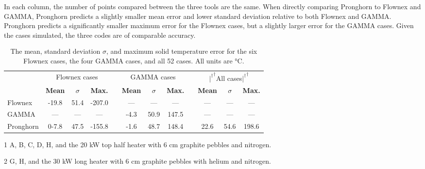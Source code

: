 In each column, the number of points compared between the three tools are the same. When directly comparing Pronghorn to Flownex and GAMMA, Pronghorn predicts a slightly smaller mean error and lower standard deviation relative to both Flownex and GAMMA. Pronghorn predicts a significantly smaller maximum error for the Flownex cases, but a slightly larger error for the GAMMA cases. Given the cases simulated, the three codes are of comparable accuracy. 

\begin{table}[h!]
\centering
\begin{threeparttable}
\caption{The mean, standard deviation \(\sigma\), and maximum solid temperature error for the six Flownex cases, the four GAMMA cases, and all 52 cases. All units are \si{\celsius}.}
\begin{tabular}{@{}lcc c c c cc c c c c@{}}
\toprule
 & \multicolumn{3}{c}{Flownex cases\hspace{0.01cm}\tnote{1}} &\phantom{a}& \multicolumn{3}{c}{GAMMA cases\hspace{0.01cm}\tnote{2}} &\phantom{a}& \multicolumn{3}{c}{\color{white}${\rvert^\dagger}^\dagger$\color{black}All cases\color{white}${\rvert^\dagger}^\dagger$\color{black}}\\
\cmidrule{2-4} \cmidrule{6-8} \cmidrule{10-12}
 & \textbf{Mean} & {\boldmath\(\sigma\)} & \textbf{Max.} && \textbf{Mean} & {\boldmath\(\sigma\)} & \textbf{Max.} && \textbf{Mean} & {\boldmath\(\sigma\)} & \textbf{Max.}\\
\midrule
Flownex & \color{white}-\color{black}19.8 & 51.4 & \color{white}-\color{black}207.0 && --- & --- & --- && --- & --- & ---\\
GAMMA & --- & --- & --- && \color{white}-\color{black}4.3 & 50.9 & 147.5 && --- & --- & ---\\
Pronghorn & \color{white}0\color{black}-7.8 & 47.5 & -155.8 && -1.6 & 48.7 & 148.4 && 22.6 & 54.6 & 198.6\\
\bottomrule
\end{tabular}
\label{table:stats}
\begin{tablenotes}
\item[1] \small A, B, C, D, H, and the 20 \si{\kilo\watt} top half heater with 6 \si{\centi\meter} graphite pebbles and nitrogen.
\item[2] \small G, H, and the 30 \si{\kilo\watt} long heater with 6 \si{\centi\meter} graphite pebbles with helium and nitrogen.
\end{tablenotes}
\end{threeparttable}
\end{table}

